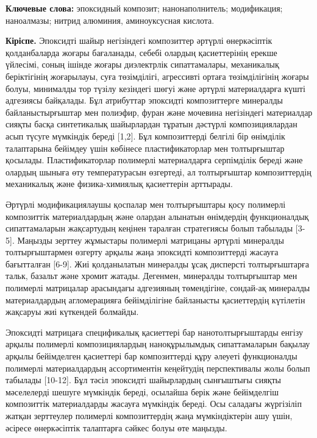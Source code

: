 {\bfseries Ключевые слова:} эпоксидный композит; нанонаполнитель;
модификация; наноалмазы; нитрид алюминия, аминоуксусная кислота.

\begin{multicols}{2}
{\bfseries Кіріспе.} Эпоксидті шайыр негізіндегі композиттер әртүрлі
өнеркәсіптік қолданбаларда жоғары бағаланады, себебі олардың
қасиеттерінің ерекше үйлесімі, соның ішінде жоғары диэлектрлік
сипаттамалары, механикалық беріктігінің жоғарылауы, суға төзімділігі,
агрессивті ортаға төзімділігінің жоғары болуы, минималды тор түзілу
кезіндегі шөгуі және әртүрлі материалдарға күшті адгезиясы байқалады.
Бұл атрибуттар эпоксидті композиттерге минералды байланыстырғыштар мен
полиэфир, фуран және мочевина негізіндегі материалдар сияқты басқа
синтетикалық шайырлардан тұратын дәстүрлі композициялардан асып түсуге
мүмкіндік береді {[}1,2{]}. Бұл композиттерді белгілі бір өнімділік
талаптарына бейімдеу үшін көбінесе пластификаторлар мен толтырғыштар
қосылады. Пластификаторлар полимерлі материалдарға серпімділік береді
және олардың шыныға өту температурасын өзгертеді, ал толтырғыштар
композиттердің механикалық және физика-химиялық қасиеттерін арттырады.

Әртүрлі модификациялаушы қоспалар мен толтырғыштары қосу полимерлі
композиттік материалдардың және олардан алынатын өнімдердің
функционалдық сипаттамаларын жақсартудың кеңінен таралған стратегиясы
болып табылады {[}3-5{]}. Маңызды зерттеу жұмыстары полимерлі матрицаны
әртүрлі минералды толтырғыштармен өзгерту арқылы жаңа эпоксидті
композиттерді жасауға бағытталған {[}6-9{]}. Жиі қолданылатын минералды
ұсақ дисперсті толтырғыштарға тальк, базальт және хромит жатады.
Дегенмен, минералды толтырғыштар мен полимерлі матрицалар арасындағы
адгезияның төмендігіне, сондай-ақ минералды материалдардың агломерацияға
бейімділігіне байланысты қасиеттердің күтілетін жақсаруы жиі күткендей
болмайды.

Эпоксидті матрицаға спецификалық қасиеттері бар нанотолтырғыштарды
енгізу арқылы полимерлі композициялардың наноқұрылымдық сипаттамаларын
бақылау арқылы бейімделген қасиеттері бар композиттерді құру әлеуеті
функционалды полимерлі материалдардың ассортиментін кеңейтудің
перспективалы жолы болып табылады {[}10-12{]}. Бұл тәсіл эпоксидті
шайырлардың сынғыштығы сияқты мәселелерді шешуге мүмкіндік береді,
осылайша берік және бейімделгіш композиттік материалдарды жасауға
мүмкіндік береді. Осы саладағы жүргізіліп жатқан зерттеулер полимерлі
композиттердің жаңа мүмкіндіктерін ашу үшін, әсіресе өнеркәсіптік
талаптарға сәйкес болуы өте маңызды.


\end{multicols}
